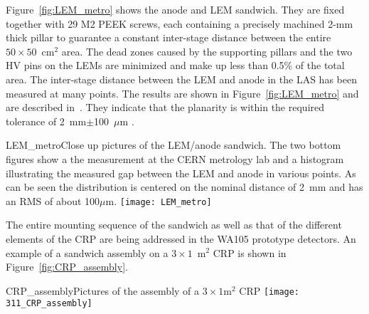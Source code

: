 Figure~\ref{fig:LEM_metro} shows the anode and LEM
sandwich.  They are fixed together with 29 M2 PEEK screws, each
containing a precisely machined 2-mm thick pillar to
guarantee a constant inter-stage distance between the entire
$50\times50$~cm$^2$ area. 
 The dead zones caused by the supporting
pillars and the two HV pins on the LEMs are minimized and make up %
less than 0.5\% of the total area. The inter-stage distance between the
LEM and anode in the LAS has been measured at many points. The results
are shown in Figure~\ref{fig:LEM_metro} and are described
in~\cite{EDMS_metro_lem_anode}. They indicate that the planarity is
within the required tolerance of 2~mm$\pm$100~$\mu$m .
\begin{cdrfigure}{LEM_metro}{Close up pictures of the LEM/anode sandwich. The two
       bottom figures show a the measurement at the CERN metrology lab
       and a histogram illustrating the measured gap between the LEM
       and anode in various points. As can be seen the distribution is
       centered on the nominal distance of 2~mm and has an RMS of
       about 100$\mu$m.}
     \texttt{[image: LEM\_metro]}
\end{cdrfigure}

The entire mounting sequence of the sandwich as well as that of the
different elements of the CRP are being addressed in the WA105
prototype detectors. An example of a sandwich assembly on a
$3\times1$~m$^2$ CRP is shown in Figure~\ref{fig:CRP_assembly}.
\begin{cdrfigure}{CRP_assembly}{Pictures of the assembly of a $3\times1$m$^2$ CRP}
     \texttt{[image: 311\_CRP\_assembly]}  
\end{cdrfigure}

